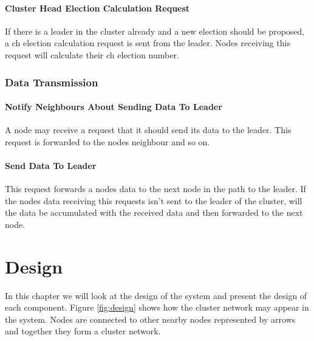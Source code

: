 \documentclass[USenglish]{uit-thesis}
\begin{document}
\subsubsection{Cluster Head Election Calculation Request}
If there is a leader in the cluster already and a new election should be proposed, a \gls{ch} election calculation request is sent from the leader. Nodes receiving this request will calculate their \gls{ch} election number. %

\subsection{Data Transmission}
\subsubsection{Notify Neighbours About Sending Data To Leader}
A node may receive a request that it should send its data to the leader. This request is forwarded to the nodes neighbour and so on.

\subsubsection{Send Data To Leader}
This request forwards a nodes data to the next node in the path to the leader. If the nodes data receiving this requests isn't sent to the leader of the cluster, will the data be accumulated with the received data and then forwarded to the next node.



\chapter{Design}
In this chapter we will look at the design of the system and present the design of each component. Figure \ref{fig:design} shows how the cluster network may appear in the system. Nodes are connected to other nearby nodes represented by arrows and together they form a cluster network.
\end{document}
